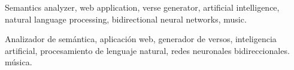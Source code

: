 \begin{IEEEkeywords}
    Semantics analyzer, web application, verse generator,
    artificial intelligence, natural language processing,
    bidirectional neural networks, music.
\end{IEEEkeywords}
\vspace{5mm}
\begin{palabrasclave}    
    Analizador de semántica, aplicación web, generador de versos,
    inteligencia artificial, procesamiento de lenguaje natural,
    redes neuronales bidireccionales. música.
  \end{palabrasclave}
  
  
  
